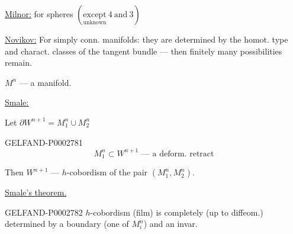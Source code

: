 \underline{\underline{Milnor:}} for spheres $(\underset{\text{unknown}}{\text{except}}\ 4\ \text{and}\ 3)$





\underline{\underline{Novikov:}} For simply conn. manifolds: they are determined by the homot. type and charact. classes of the tangent bundle --- then finitely many possibilities remain.

$M^n$ --- a manifold.

\underline{\underline{Smale:}}

Let $\partial W^{n+1}=M_1^n\cup M_2^n$

\begin{GelfandAdjacentEvidence}{GELFAND-P000278}{1}
\begin{equation*}M_1^n\subset W^{n+1}\text{ --- a deform. retract}\end{equation*}





\end{GelfandAdjacentEvidence}


Then $W^{n+1}$ --- $h$-cobordism of the pair $(M_1^n, M_2^n)$.

\underline{Smale’s theorem.}

\begin{GelfandAdjacentEvidence}{GELFAND-P000278}{2}
$h$-cobordism (film) is completely (up to diffeom.) determined by a boundary (one of $M_i^n$) and an invar.

\end{GelfandAdjacentEvidence}


